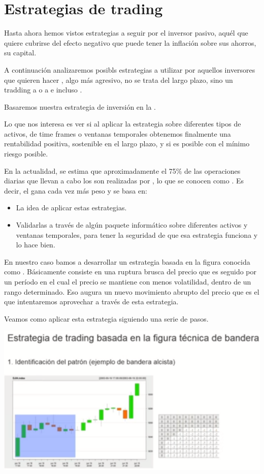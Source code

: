 \section{Estrategias de trading}

Hasta ahora hemos vistos estrategias a seguir por el inversor pasivo, aquél que quiere cubrirse del efecto negativo que puede tener la inflación sobre sus ahorros, su capital. 

A continuación analizaremos posibls estrategias a utilizar por aquellos inversores que quieren hacer , algo más agresivo, no se trata del largo plazo, sino un tradding a  o a  e incluso .

Basaremos nuestra estrategia de inversión en la .

Lo que nos interesa es ver si al aplicar la estrategia sobre diferentes tipos de activos, de time frames o ventanas temporales obtenemos finalmente una rentabilidad positiva, sostenible en el largo plazo, y  si es posible con el mínimo riesgo posible.

En la actualidad, se estima que aproximadamente el 75\% de las operaciones diarias que llevan a cabo los  son realizadas por , lo que se conocen como . Es decir, el  gana cada vez más peso y se basa en:
\begin{itemize}
    \item La idea de aplicar estas estrategias.
    \item Validarlas a través de algún paquete informático sobre diferentes activos y ventanas temporales, para tener la seguridad de que esa estrategia funciona y lo hace bien.
\end{itemize}

En nuestro caso bamos a desarrollar un estrategia basada en la figura conocida como . Básicamente  consiste en una ruptura brusca del precio que es seguido por un período en el cual el precio se mantiene con menos volatilidad, dentro de un rango determinado. Eso augura un nuevo movimiento abrupto del precio que es el que intentaremos aprovechar a través de esta estrategia.

Veamos como aplicar esta estrategia siguiendo una serie de pasos.

\begin{center}
    \includegraphics[scale=.45]{images/mod03-12.png}
\end{center}

